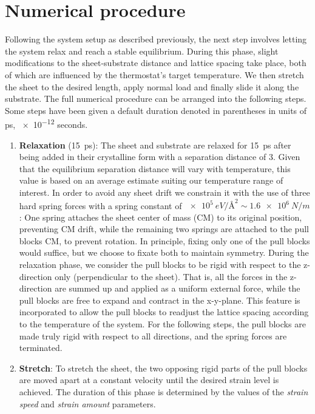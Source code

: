 \section{Numerical procedure}\label{sec:num_proc}
Following the system setup as described previously, the next step involves letting the system relax and reach a stable equilibrium. During this phase, slight modifications to the sheet-substrate distance and lattice spacing take place, both of which are influenced by the thermostat's target temperature. We then stretch the sheet to the desired length, apply normal load and finally slide it along the substrate. The full numerical procedure can be arranged into the following steps. Some steps have been given a default duration denoted in parentheses in units of ps, \num{e-12} seconds.
\begin{enumerate}
  \item \textbf{Relaxation} (\SI{15}{ps}): The sheet and substrate are relaxed for 
  \SI{15}{ps} after being added in their crystalline form with a separation distance of \SI{3}{}. Given that the equilibrium separation distance will vary with temperature, this value is based on an average estimate suiting our temperature range of interest. In order to avoid any sheet drift we constrain it with the use of three hard spring forces with a spring constant of
  $\SI{e5}{eV/\text{Å}^2} \sim \SI{1.6e6}{N/m}$: One spring attaches the sheet center of mass (\acrshort{CM}) to its original position, preventing \acrshort{CM} drift, while the remaining two springs are attached to the pull blocks \acrshort{CM}, to prevent rotation. In principle, fixing only one of the pull blocks would suffice, but we choose to fixate both to maintain symmetry. During the relaxation phase, we consider the pull blocks to be rigid with respect to the z-direction only (perpendicular to the sheet). That is, all the forces in the z-direction are summed up and applied as a uniform external force, while the pull blocks are free to expand and contract in the x-y-plane. This feature is incorporated to allow the pull blocks to readjust the lattice spacing according to the temperature of the system. For the following steps, the pull blocks are made truly rigid with respect to all directions, and the spring forces are terminated. 
  \item \textbf{Stretch}: To stretch the sheet, the two opposing rigid parts of the pull blocks are moved apart at a constant velocity until the desired strain level is achieved. The duration of this phase is determined by the values of the \textit{strain speed} and \textit{strain amount} parameters.

\end{enumerate}
